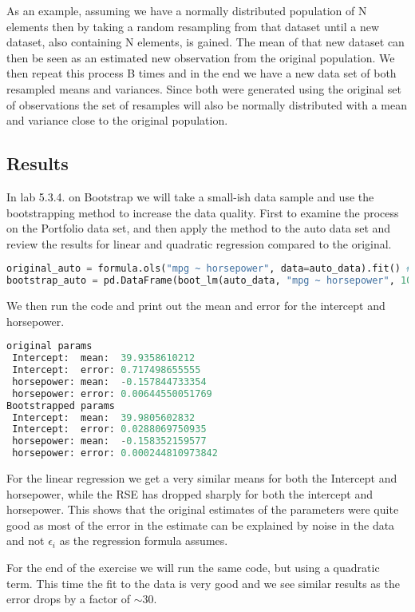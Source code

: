 As an example, assuming we have a normally distributed population of N elements then by taking a random resampling from that dataset until a new dataset, also containing N elements, is gained. The mean of that new dataset can then be seen as an estimated new observation from the original population. We then repeat this process B times and in the end we have a new data set of both resampled means and variances. Since both were generated using the original set of observations the set of resamples will also be normally distributed with a mean and variance close to the original population. 
\fi

\subsection{Results}

In lab 5.3.4. on Bootstrap we will take a small-ish data sample and use the bootstrapping method to increase the data quality. First to examine the process on the Portfolio data set, and then apply the method to the auto data set and review the results for linear and quadratic regression compared to the original.

\begin{lstlisting}[language=Python]
original_auto = formula.ols("mpg ~ horsepower", data=auto_data).fit() # Calculate linear regression on original data.
bootstrap_auto = pd.DataFrame(boot_lm(auto_data, "mpg ~ horsepower", 1000)) # Calculate linear regression on the bootstrap data.
\end{lstlisting}
We then run the code and print out the mean and error for the intercept and horsepower.
\begin{lstlisting}[language=Python]
original params
 Intercept:  mean:  39.9358610212
 Intercept:  error: 0.717498655555
 horsepower: mean:  -0.157844733354
 horsepower: error: 0.00644550051769
Bootstrapped params
 Intercept:  mean:  39.9805602832
 Intercept:  error: 0.0288069750935
 horsepower: mean:  -0.158352159577
 horsepower: error: 0.000244810973842
\end{lstlisting}

For the linear regression we get a very similar means for both the Intercept and horsepower, while the RSE has dropped sharply for both the intercept and horsepower. This shows that the original estimates of the parameters were quite good as most of the error in the estimate can be explained by noise in the data and not $\epsilon_i$ as the regression formula assumes.

For the end of the exercise we will run the same code, but using a quadratic term. This time the fit to the data is very good and we see similar results as the error drops by a factor of $\sim30$.

